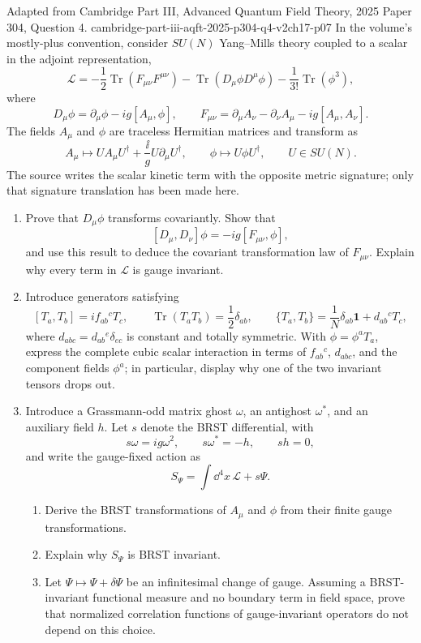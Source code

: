 \begin{enumerate}
  {Adapted from Cambridge Part III, Advanced Quantum Field Theory, 2025
  Paper 304, Question 4.}
  {cambridge-part-iii-aqft-2025-p304-q4-v2ch17-p07}
  In the volume's mostly-plus convention, consider \(SU(N)\) Yang--Mills
  theory coupled to a scalar in the adjoint representation,
  \[
    \mathcal L=-\frac12\operatorname{Tr}(F_{\mu\nu}F^{\mu\nu})
      -\operatorname{Tr}(D_\mu\phi D^\mu\phi)
      -\frac1{3!}\operatorname{Tr}(\phi^3),
  \]
  where
  \[
    D_\mu\phi=\partial_\mu\phi-ig[A_\mu,\phi],\qquad
    F_{\mu\nu}=\partial_\mu A_\nu-\partial_\nu A_\mu
      -ig[A_\mu,A_\nu].
  \]
  The fields \(A_\mu\) and \(\phi\) are traceless Hermitian matrices and
  transform as
  \[
    A_\mu\longmapsto UA_\mu U^\dagger
      +\frac{\ii}{g}U\partial_\mu U^\dagger,\qquad
    \phi\longmapsto U\phi U^\dagger,\qquad U\in SU(N).
  \]
  The source writes the scalar kinetic term with the opposite metric
  signature; only that signature translation has been made here.
  \begin{enumerate}
    \item[(a)]
    Prove that \(D_\mu\phi\) transforms covariantly.  Show that
    \[
      [D_\mu,D_\nu]\phi=-ig[F_{\mu\nu},\phi],
    \]
    and use this result to deduce the covariant transformation law of
    \(F_{\mu\nu}\).  Explain why every term in \(\mathcal L\) is gauge
    invariant.
    \item[(b)]
    Introduce generators satisfying
    \[
      [T_a,T_b]=if_{ab}{}^cT_c,\qquad
      \operatorname{Tr}(T_aT_b)=\frac12\delta_{ab},
      \qquad
      \{T_a,T_b\}=\frac1N\delta_{ab}\mathbf{1}+d_{ab}{}^cT_c,
    \]
    where \(d_{abc}=d_{ab}{}^e\delta_{ec}\) is constant and totally
    symmetric.  With \(\phi=\phi^aT_a\), express the complete cubic scalar
    interaction in terms of \(f_{ab}{}^c\), \(d_{abc}\), and the component
    fields \(\phi^a\); in particular, display why one of the two invariant
    tensors drops out.
    \item[(c)]
    Introduce a Grassmann-odd matrix ghost \(\omega\), an antighost
    \(\omega^*\), and an auxiliary field \(h\).  Let \(s\) denote the BRST
    differential, with
    \[
      s\omega=ig\omega^2,\qquad s\omega^*=-h,\qquad sh=0,
    \]
    and write the gauge-fixed action as
    \[
      S_\Psi=\int \dd^4x\,\mathcal L+s\Psi .
    \]
    \begin{enumerate}
      \item[(i)] Derive the BRST transformations of \(A_\mu\) and \(\phi\)
      from their finite gauge transformations.
      \item[(ii)] Explain why \(S_\Psi\) is BRST invariant.
      \item[(iii)] Let \(\Psi\mapsto\Psi+\delta\Psi\) be an infinitesimal
      change of gauge.  Assuming a BRST-invariant functional measure and
      no boundary term in field space, prove that normalized correlation
      functions of gauge-invariant operators do not depend on this choice.
    \end{enumerate}
  \end{enumerate}


\end{enumerate}
